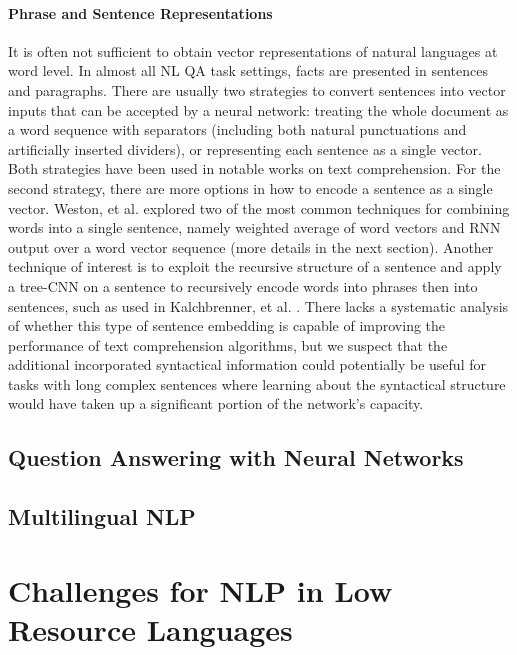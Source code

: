 \documentclass[]{article}
\begin{document}
\paragraph{Phrase and Sentence Representations}
It is often not sufficient to obtain vector representations of natural languages at word level. In almost all NL QA task settings, facts are presented in sentences and paragraphs. There are usually two strategies to convert sentences into vector inputs that can be accepted by a neural network: treating the whole document as a word sequence with separators (including both natural punctuations and artificially inserted dividers), or representing each sentence as a single vector. Both strategies have been used in notable works on text comprehension. For the second strategy, there are more options in how to encode a sentence as a single vector. Weston, et al. \cite{weston2014memory} explored two of the most common techniques for combining words into a single sentence, namely weighted average of word vectors and RNN output over a word vector sequence (more details in the next section).  
Another technique of interest is to exploit the recursive structure of a sentence and apply a tree-CNN on a sentence to recursively encode words into phrases then into sentences, such as used in Kalchbrenner, et al. \cite{kalchbrenner2014convolutional}. There lacks a systematic analysis of whether this type of sentence embedding is capable of improving the performance of text comprehension algorithms, but we suspect that the additional incorporated syntactical information could potentially be useful for tasks with long complex sentences where learning about the syntactical structure would have taken up a significant portion of the network’s capacity. 

\subsection{Question Answering with Neural Networks}

\subsection{Multilingual NLP}


\section{Challenges for NLP in Low Resource Languages}
\end{document}

